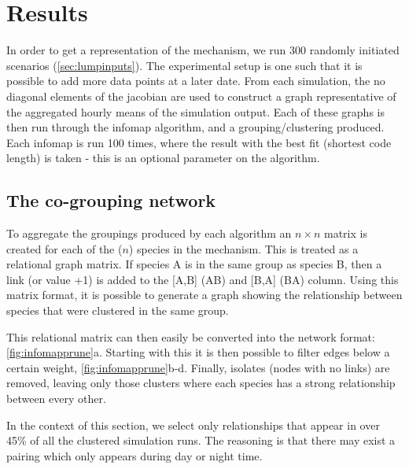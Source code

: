 %


\section{Results}

In order to get a representation of the mechanism, we run 300 randomly initiated scenarios (\autoref{sec:lumpinputs}). The experimental setup is one such that it is possible to add more data points at a later date. From each simulation, the no diagonal elements of the jacobian are used to construct a graph representative of the aggregated hourly means of the simulation output. Each of these graphs is then run through the infomap algorithm, and a grouping/clustering produced. Each infomap is run 100 times, where the result with the best fit (shortest code length) is taken - this is an optional parameter on the algorithm.

\subsection{The co-grouping network}

To aggregate the groupings produced by each algorithm an $n\times n$ matrix is created for each of the ($n$) species in the mechanism. This is treated as a relational graph matrix. If species A is in the same group as species B, then a link (or value +1) is added to the [A,B] (A\ce{->}B) and [B,A] (B\ce{->}A) column. Using this matrix format, it is possible to generate a graph showing the relationship between species that were clustered in the same group.

This relational matrix can then easily be converted into the network format: \autoref{fig:infomapprune}a. Starting with this it is then possible to filter edges below a certain weight, \autoref{fig:infomapprune}b-d. Finally, isolates (nodes with no links) are removed, leaving only those clusters where each species has a strong relationship between every other.

In the context of this section, we select only relationships that appear in over 45\% of all the clustered simulation runs. The reasoning is that there may exist a pairing which only appears during day or night time.

